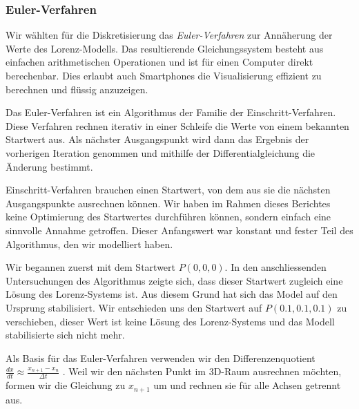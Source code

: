 \subsubsection{Euler-Verfahren} \label{euler-verfahren}
Wir wählten für die Diskretisierung das {\em Euler-Verfahren} zur Annäherung der Werte des Lorenz-Modells. Das resultierende Gleichungssystem besteht aus einfachen arithmetischen Operationen und ist für einen Computer direkt berechenbar. Dies erlaubt auch Smartphones die Visualisierung effizient zu berechnen und flüssig anzuzeigen.
%

Das Euler-Verfahren ist ein Algorithmus der Familie der Einschritt-Verfahren. Diese Verfahren rechnen iterativ in einer Schleife die Werte von einem bekannten Startwert aus. Als nächster Ausgangspunkt wird dann das Ergebnis der vorherigen Iteration genommen und mithilfe der Differentialgleichung die Änderung bestimmt. 

Einschritt-Verfahren brauchen einen Startwert, von dem aus sie die nächsten Ausgangspunkte ausrechnen können. Wir haben im Rahmen dieses Berichtes keine Optimierung des Startwertes durchführen können, sondern einfach eine sinnvolle Annahme getroffen. Dieser Anfangswert war konstant und fester Teil des Algorithmus, den wir modelliert haben.

Wir begannen zuerst mit dem Startwert $ P(0, 0, 0) $. In den anschliessenden Untersuchungen des Algorithmus zeigte sich, dass dieser Startwert zugleich eine Lösung des Lorenz-Systems ist. Aus diesem Grund hat sich das Model auf den Ursprung stabilisiert. Wir entschieden uns den Startwert auf $ P(0.1, 0.1, 0.1) $ zu verschieben, dieser Wert ist keine Lösung des Lorenz-Systems und das Modell stabilisierte sich nicht mehr.

Als Basis für das Euler-Verfahren verwenden wir den Differenzenquotient $ \frac{dx}{dt} \approx \frac{x_{n + 1} - x_n}{\Delta t} $ \cite{dahmen2008}.  Weil wir den nächsten Punkt im 3D-Raum ausrechnen möchten, formen wir die Gleichung zu $ x_{n + 1} $  um und rechnen sie für alle Achsen getrennt aus.

